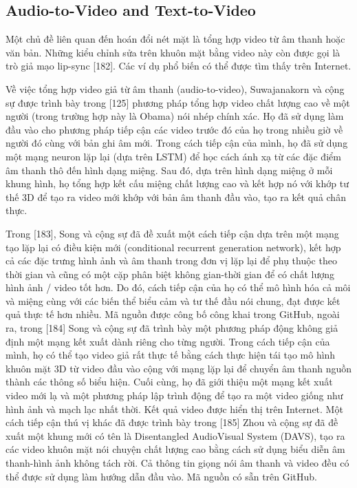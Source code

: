 \documentclass{article}
\begin{document}
\subsection{Audio-to-Video and Text-to-Video}


Một chủ đề liên quan đến hoán đổi nét mặt là tổng hợp video từ âm thanh hoặc văn bản. Những kiểu chỉnh sửa trên khuôn mặt bằng video này còn được gọi là trò giả mạo lip-sync [182]. Các ví dụ phổ biến có thể được tìm thấy trên Internet.

Về việc tổng hợp video giả từ âm thanh (audio-to-video), Suwajanakorn và cộng sự được trình bày trong [125] phương pháp tổng hợp video chất lượng cao về một người (trong trường hợp này là Obama) nói nhép chính xác. Họ đã sử dụng làm đầu vào cho phương pháp tiếp cận các video trước đó của họ trong nhiều giờ về người đó cùng với bản ghi âm mới. Trong cách tiếp cận của mình, họ đã sử dụng một mạng neuron lặp lại (dựa trên LSTM) để học cách ánh xạ từ các đặc điểm âm thanh thô đến hình dạng miệng. Sau đó, dựa trên hình dạng miệng ở mỗi khung hình, họ tổng hợp kết cấu miệng chất lượng cao và kết hợp nó với khớp tư thế 3D để tạo ra video mới khớp với bản âm thanh đầu vào, tạo ra kết quả chân thực.

Trong [183], Song và cộng sự đã đề xuất một cách tiếp cận dựa trên một mạng tạo lặp lại có điều kiện mới (conditional recurrent generation network), kết hợp cả các đặc trưng hình ảnh và âm thanh trong đơn vị lặp lại để phụ thuộc theo thời gian và cũng có một cặp phân biệt không gian-thời gian để có chất lượng hình ảnh / video tốt hơn. Do đó, cách tiếp cận của họ có thể mô hình hóa cả môi và miệng cùng với các biến thể biểu cảm và tư thế đầu nói chung, đạt được kết quả thực tế hơn nhiều. Mã nguồn được công bố công khai trong GitHub, ngoài ra, trong [184] Song và cộng sự đã trình bày một phương pháp động không giả định một mạng kết xuất dành riêng cho từng người. Trong cách tiếp cận của mình, họ có thể tạo video giả rất thực tế bằng cách thực hiện tái tạo mô hình khuôn mặt 3D từ video đầu vào cộng với mạng lặp lại để chuyển âm thanh nguồn thành các thông số biểu hiện. Cuối cùng, họ đã giới thiệu một mạng kết xuất video mới lạ và một phương pháp lập trình động để tạo ra một video giống như hình ảnh và mạch lạc nhất thời. Kết quả video được hiển thị trên Internet. Một cách tiếp cận thú vị khác đã được trình bày trong [185] Zhou và cộng sự đã đề xuất một khung mới có tên là Disentangled AudioVisual System (DAVS), tạo ra các video khuôn mặt nói chuyện chất lượng cao bằng cách sử dụng biểu diễn âm thanh-hình ảnh không tách rời. Cả thông tin giọng nói âm thanh và video đều có thể được sử dụng làm hướng dẫn đầu vào. Mã nguồn có sẵn trên GitHub.
\end{document}
